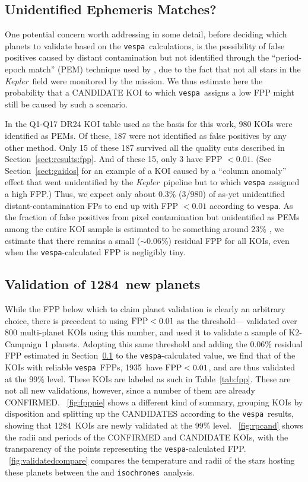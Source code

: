 \documentclass{emulateapj}
\newcommand{\figref}[1]{\ref{fig:#1}}
\newcommand{\Fig}[1]{\figurename~\figref{#1}}
\newcommand{\Tab}[1]{Table~\ref{tab:#1}}
\newcommand{\tab}[1]{\Tab{#1}}
\newcommand{\sectionname}{Section}
\newcommand{\Sect}[1]{\sectionname~\ref{sect:#1}}
\newcommand{\sect}[1]{\Sect{#1}}
\newcommand{\sectlabel}[1]{\label{sect:#1}}
\newcommand{\nval}{1935} %
\newcommand{\nvalnew}{1284} %
\newcommand{\kepler}{\textit{Kepler}}
\newcommand{\vespa}{\texttt{vespa}}
\newcommand{\isochrones}{\texttt{isochrones}}
\begin{document}
\subsection{Unidentified Ephemeris Matches?}
\sectlabel{PEMs}

One potential concern worth addressing in some detail, before deciding
which planets to validate based on the \vespa\ calculations, is the 
possibility of false positives caused by distant contamination
but not identified through the ``period-epoch match'' (PEM) technique
used by \citet{Coughlin:2014}, due to the fact that not all stars in the 
\kepler\ field were monitored by the mission.  We thus estimate here
the probability that a CANDIDATE KOI to which \vespa\ assigns a low FPP
might still be caused by such a scenario.

In the Q1-Q17 DR24 KOI table used as the basis for this work, 980
KOIs were identified as PEMs.  Of these, 187 were not identified 
as false positives by any other method.  Only 15 of these 187 survived 
all the quality cuts described in \sect{results:fpp}. And of these 15, 
only 3 have FPP $< 0.01$.  (See \sect{gaidos} for an example of a KOI caused by a 
``column anomaly'' effect that went unidentified by the \kepler\ pipeline but
to which \vespa\ assigned a high FPP.)  Thus, we expect only about 0.3\% (3/980) of 
as-yet unidentified distant-contamination FPs to end
up with FPP $< 0.01$ according to \vespa. As the fraction of false positives
from pixel contamination but unidentified as PEMs among the entire KOI sample is
estimated to be something around 23\% \citep{Coughlin:2014}, we estimate
that there remains a small ($\sim$0.06\%) residual FPP for all KOIs, even 
when the \vespa-calculated FPP is negligibly tiny.

\subsection{Validation of \nvalnew\ new planets}

While the FPP below which to claim planet validation is clearly
an arbitrary choice, there is precedent to using ${\rm FPP} <0.01$ as 
the threshold---\citet{Rowe:2014} validated over 800 multi-planet KOIs
using this number, and \citet{Montet:2015} used it to validate a sample
of K2-Campaign 1 planets.  Adopting this same threshold and adding
the 0.06\% residual FPP estimated in \sect{PEMs} to the \vespa-calculated
value, we find that 
of the KOIs with reliable \vespa\ FPPs, \nval\ have ${\rm FPP}
<0.01$, and are thus validated at the 99\% level.  
These KOIs are labeled as such in \tab{fpp}.  These are not all new validations,
however, since a number of them are already CONFIRMED. \Fig{fpppie}
shows a different kind of summary, grouping KOIs by disposition and
splitting up the CANDIDATES according to the \vespa\ results, showing
that \nvalnew\ KOIs are newly validated at the 99\% level.
\Fig{rpcand} shows the radii and periods of the CONFIRMED and 
CANDIDATE KOIs, with the transparency of the points representing
the \vespa-calculated FPP.  \Fig{validatedcompare} compares the temperature
and radii of the stars hosting these planets between the 
and \isochrones\ analysis.
\end{document}
